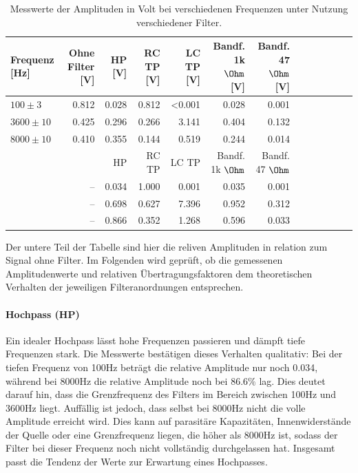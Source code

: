 \begin{table}
    \centering
    \caption{Messwerte der Amplituden in Volt bei verschiedenen Frequenzen unter Nutzung verschiedener Filter.}
    \label{tab:FFT_amps}
    \begin{tabular}{l || r | r r r r r r r r r r r}
    \toprule
    Frequenz [Hz] & Ohne Filter [V] & HP [V] & RC TP [V] & LC TP [V] & Bandf. 1k $\Ohm$ [V] & Bandf. 47 $\Ohm$ [V] \\
    \midrule
    $100  \pm  3$ & 0.812 & 0.028 & 0.812 & <0.001 & 0.028 & 0.001 \\
    $3600 \pm 10$ & 0.425 & 0.296 & 0.266 & 3.141 & 0.404 & 0.132 \\
    $8000 \pm 10$ & 0.410 & 0.355 & 0.144 & 0.519 & 0.244 & 0.014 \\
    \toprule
      &   & HP & RC TP & LC TP & Bandf. 1k $\Ohm$  & Bandf. 47 $\Ohm$ \\
    \midrule
     & -- & 0.034 & 1.000 & 0.001 & 0.035 & 0.001 \\
     & -- & 0.698 & 0.627 & 7.396 & 0.952 & 0.312 \\
     & -- & 0.866 & 0.352 & 1.268 & 0.596 & 0.033 \\
    \bottomrule
    \end{tabular}
\end{table}

Der untere Teil der Tabelle sind hier die reliven Amplituden in relation zum Signal ohne Filter. 
Im Folgenden wird geprüft, ob die gemessenen Amplitudenwerte und relativen Übertragungsfaktoren dem theoretischen Verhalten der jeweiligen Filteranordnungen entsprechen.

\paragraph{Hochpass (HP)}
Ein idealer Hochpass lässt hohe Frequenzen passieren und dämpft tiefe Frequenzen stark. Die Messwerte bestätigen dieses Verhalten qualitativ: Bei der tiefen Frequenz von 100Hz beträgt die relative Amplitude nur noch 0.034, während bei 8000Hz die relative Amplitude noch bei $86.6\%$ lag. Dies deutet darauf hin, dass die Grenzfrequenz des Filters im Bereich zwischen 100Hz und 3600Hz liegt. Auffällig ist jedoch, dass selbst bei 8000Hz nicht die volle Amplitude erreicht wird. Dies kann auf parasitäre Kapazitäten, Innenwiderstände der Quelle oder eine Grenzfrequenz liegen, die höher als 8000Hz ist, sodass der Filter bei dieser Frequenz noch nicht vollständig durchgelassen hat. Insgesamt passt die Tendenz der Werte zur Erwartung eines Hochpasses.

